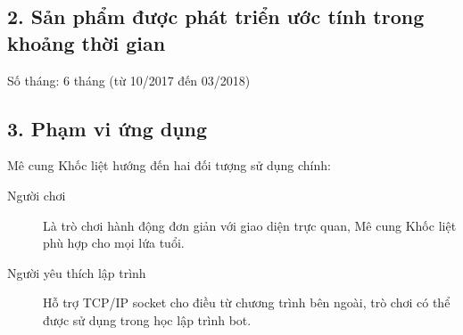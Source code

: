 \documentclass[a4paper,12pt]{article}
\begin{document}
\subsection*{2. Sản phẩm được phát triển ước tính trong khoảng thời gian}
Số tháng: 6 tháng (từ 10/2017 đến 03/2018)

\subsection*{3. Phạm vi ứng dụng}
Mê cung Khốc liệt hướng đến hai đối tượng sử dụng chính:

\begin{description}
  \item[Người chơi] Là trò chơi hành động đơn giản với giao diện trực quan, Mê
    cung Khốc liệt phù hợp cho mọi lứa tuổi.
  \item[Người yêu thích lập trình] Hỗ trợ TCP/IP socket cho điều từ chương
    trình bên ngoài, trò chơi có thể được sử dụng trong học lập trình bot.
\end{description}
\end{document}
